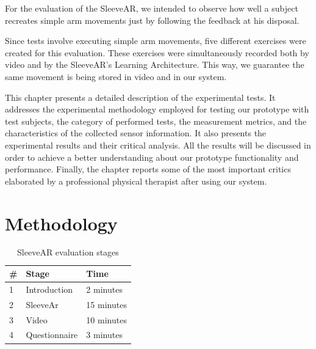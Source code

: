 For the evaluation of the SleeveAR, we intended to observe how well a subject recreates simple arm movements just by following the feedback at his disposal. 

Since tests involve executing simple arm movements, five different exercises were created for this evaluation. These exercises were simultaneously recorded both by video and by the SleeveAR's Learning Architecture. This way, we guarantee the same movement is being stored in video and in our system.

This chapter presents a detailed description of the experimental tests. It addresses the experimental methodology employed for testing our prototype with test subjects, the category of performed tests, the measurement metrics, and the characteristics of the collected sensor information. It also presents the experimental results and their critical analysis. All the results will be discussed in order to achieve a better understanding about our prototype functionality and performance.
Finally, the chapter reports some of the most important critics elaborated by a professional physical therapist after using our system.

\section{Methodology} \label{evaluation-methodology}

\begin{table}
\centering
\begin{tabular}{lll}
\hline
\multicolumn{1}{|l|}{\#}& \multicolumn{1}{l|}{Stage}         & \multicolumn{1}{l|}{Time}       \\ \hline
\multicolumn{1}{|l|}{1} & \multicolumn{1}{l|}{Introduction}  & \multicolumn{1}{l|}{2 minutes}  \\ \hline
\multicolumn{1}{|l|}{2} & \multicolumn{1}{l|}{SleeveAr}      & \multicolumn{1}{l|}{15 minutes} \\ \hline
\multicolumn{1}{|l|}{3} & \multicolumn{1}{l|}{Video}         & \multicolumn{1}{l|}{10 minutes} \\ \hline
\multicolumn{1}{|l|}{4} & \multicolumn{1}{l|}{Questionnaire} & \multicolumn{1}{l|}{3 minutes}  \\ \hline
\end{tabular}
\caption{SleeveAR evaluation stages}
\label{table:teststages}
\end{table}


